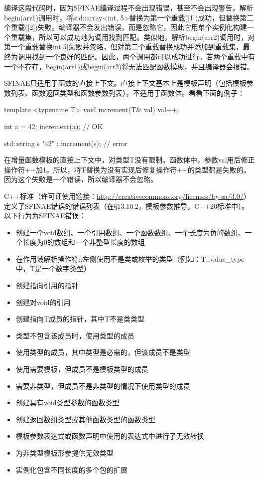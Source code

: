 编译这段代码时，因为SFINAE编译过程不会出现错误，甚至不会出现警告。解析begin(arr1)调用时，将std::array<int, 5>替换为第一个重载([1])成功，但替换第二个重载([2])失败。编译器不会发出错误，而是忽略它，因此它用单个实例化构建一个重载集，所以可以成功地为调用找到匹配。类似地，解析begin(arr2)调用时，对第一个重载替换int[5]失败并忽略，但对第二个重载替换成功并添加到重载集，最终为调用找到一个良好的匹配。因此，两个调用都可以成功进行。若两个重载中有一个不存在，begin(arr1)或begin(arr2)将无法匹配函数模板，并且编译器会报错。

SFINAE只适用于函数的直接上下文。直接上下文基本上是模板声明（包括模板参数列表、函数返回类型和函数参数列表），不适用于函数体。看看下面的例子：

\begin{cpp}
template <typename T>
void increment(T& val) { val++; }

int a = 42;
increment(a); // OK

std::string s{ "42" };
increment(s); // error
\end{cpp}

在增量函数模板的直接上下文中，对类型T没有限制。函数体中，参数val用后修正操作符++加1。所以，将T替换为没有实现后修复操作符++的类型都是失败的。因为这个失败是一个错误，所以编译器不会忽略。

C++标准（许可证使用链接：\url{http://creativecommons.org/licenses/by-sa/3.0/}）定义了SFINAE错误的错误列表（在§13.10.2，模板参数推导，C++20标准中）。以下行为为SFINAE错误：


\begin{itemize}
  \item 创建一个void数组、一个引用数组、一个函数数组、一个长度为负的数组、一个长度为0的数组和一个非整型长度的数组
  \item 在作用域解析操作符::左侧使用不是类或枚举的类型（例如：T::value\_type中，T是一个数字类型）
  \item 创建指向引用的指针
  \item 创建对void的引用
  \item 创建指向T成员的指针，其中T不是类类型
  \item 类型不包含该成员时，使用类型的成员
  \item 使用类型的成员，其中类型是必需的，但该成员不是类型
  \item 使用需要模板，但成员不是模板类型的成员
  \item 需要非类型，但成员不是非类型的情况下使用类型的成员
  \item 创建具有void类型参数的函数类型
  \item 创建返回数组类型或其他函数类型的函数类型
  \item 模板参数表达式或函数声明中使用的表达式中进行了无效转换
  \item 为非类型模板形参提供无效类型
  \item 实例化包含不同长度的多个包的扩展
\end{itemize}

